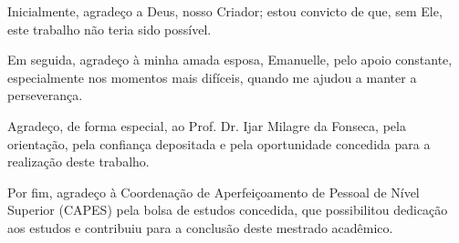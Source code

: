 Inicialmente, agradeço a Deus, nosso Criador; estou convicto de que, sem Ele, este trabalho não teria sido possível.

Em seguida, agradeço à minha amada esposa, Emanuelle, pelo apoio constante, especialmente nos momentos mais difíceis, quando me ajudou a manter a perseverança.

Agradeço, de forma especial, ao Prof. Dr. Ijar Milagre da Fonseca, pela orientação, pela confiança depositada e pela oportunidade concedida para a realização deste trabalho.

Por fim, agradeço à Coordenação de Aperfeiçoamento de Pessoal de Nível Superior (CAPES) pela bolsa de estudos concedida, que possibilitou dedicação aos estudos e contribuiu para a conclusão deste mestrado acadêmico.
